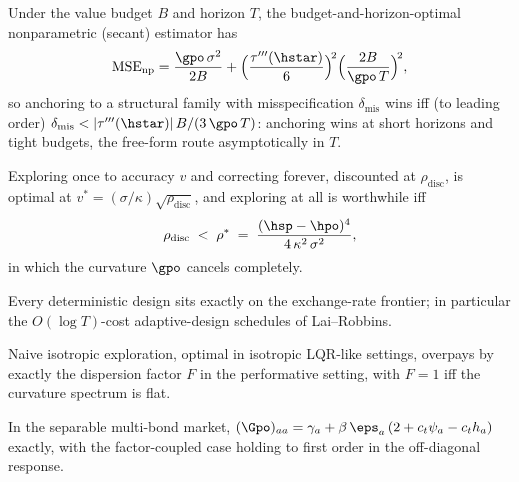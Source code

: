 \begin{theorem}
Under the value budget $B$ and horizon $T$, the budget-and-horizon-optimal
nonparametric (secant) estimator has
\[
\mathrm{MSE}_{\mathrm{np}} = \frac{\gpo\,\sigma^2}{2B}
+ \Big(\frac{\tau'''(\hstar)}{6}\Big)^{\!2}
\Big(\frac{2B}{\gpo\,T}\Big)^{\!2},
\]
so anchoring to a structural family with misspecification
$\delta_{\mathrm{mis}}$ wins iff (to leading order)
$\delta_{\mathrm{mis}} < |\tau'''(\hstar)|\,B/(3\,\gpo\,T)$: anchoring wins
at short horizons and tight budgets, the free-form route asymptotically in
$T$.
\end{theorem}

\begin{theorem}
Exploring once to accuracy $v$ and correcting forever, discounted at
$\rho_{\mathrm{disc}}$, is optimal at
$v^{*} = (\sigma/\kappa)\sqrt{\rho_{\mathrm{disc}}}$, and exploring at all
is worthwhile iff
\[
\rho_{\mathrm{disc}} \;<\; \rho^{*} \;=\;
\frac{(\hsp - \hpo)^4}{4\,\kappa^2\,\sigma^2},
\]
in which the curvature $\gpo$ cancels completely.
\end{theorem}

\begin{proposition}
Every deterministic design sits exactly on the exchange-rate frontier; in
particular the $O(\log T)$-cost adaptive-design schedules of Lai--Robbins.
\end{proposition}

\begin{proposition}
Naive isotropic exploration, optimal in isotropic LQR-like settings,
overpays by exactly the dispersion factor $F$ in the performative
setting, with $F = 1$ iff the curvature spectrum is flat.
\end{proposition}

\begin{proposition}
In the separable multi-bond market,
$(\Gpo)_{aa} = \gamma_a + \beta\,\eps_a\,(2 + c_t\psi_a - c_t h_a)$
exactly, with the factor-coupled case holding to first order in the
off-diagonal response.
\end{proposition}

